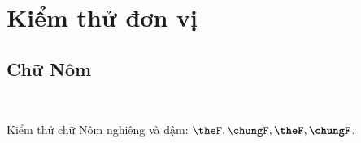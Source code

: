 \chapter*{Kiểm thử đơn vị}

\section{Chữ Nôm}

\ %

Kiểm thử chữ Nôm nghiêng và đậm: $\theF, \chungF, \textbf{\theF}, \textbf{\chungF}$.